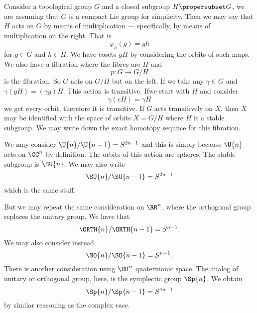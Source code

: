 
Consider a topological group $G$ and a closed subgroup
$H\propersubset G$, we are assuming that $G$ is a compact Lie
group for simplicity. Then we may say that $H$ acts on $G$ by
means of multiplication --- specifically, by means of
multiplication on the right. That is
\begin{equation}
\varphi_{h}(g)=gh
\end{equation}
for $g\in G$ and $h\in H$. We have cosets $gH$ by considering the
orbits of such maps. We also have a fibration where the fibres
are $H$ and 
\begin{equation}
p\colon G\to G/H
\end{equation}
is the fibration. So $G$ acts on $G/H$ but on the left. If we
take any $\gamma\in G$ and $\gamma(gH)=(\gamma g)H$. This action
is transitive. Ifwe start with $H$ and consider
\begin{equation}
\gamma(eH)=\gamma H
\end{equation}
we get every orbit, therefore it is transitive. If $G$ acts
transitively on $X$, then $X$ may be identified with the space of
orbits $X=G/H$ where $H$ is a stable subgroup. We may write down
the exact homotopy sequnce for this fibration.

\begin{ex}
We may consider $\U{n}/\U{n-1}=S^{2n-1}$ and this is simply
because $\U{n}$ acts on $\CC^n$ by definition. The orbits of this
action are spheres. The stable subgroup is $\SU{n}$. We may also
write 
\begin{equation}
\SU{n}/\SU{n-1}=S^{2n-1} 
\end{equation}
which is the same stuff.

But we may repeat the same consideration on $\RR^n$, where the
orthogonal group replaces the unitary group. We have that 
\begin{equation}
\ORTH{n}/\ORTH{n-1}=S^{n-1}.
\end{equation}
We may also consider instead
\begin{equation}
\SO{n}/\SO{n-1}=S^{n-1}.
\end{equation}
There is another consideration using $\HH^n$ quaternionic
space. The analog of unitary or orthogonal group, here, is the
symplectic group $\Sp{n}$. We obtain
\begin{equation}
\Sp{n}/\Sp{n-1}=S^{4n-1}
\end{equation}
by similar reasoning as the complex case.
\end{ex}

